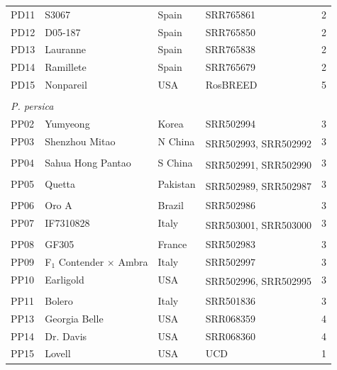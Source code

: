 \documentclass[12pt]{article}
\begin{document}
\begin{center}
\begin{longtable}{llllc}
	PD11 &S3067 &Spain &SRR765861 &2\\
	PD12 &D05-187 &Spain &SRR765850 &2\\
	PD13 &Lauranne &Spain &SRR765838 &2\\
	PD14 &Ramillete &Spain &SRR765679 &2\\
	PD15 &Nonpareil & USA&RosBREED &5\\
	\\
	\multicolumn{5}{l}{\emph{P. persica}}  \\ %
	PP02 &Yumyeong &Korea &SRR502994 &3\\
	PP03 &Shenzhou Mitao &N China &
	\multirow{2}{1cm}{SRR502993, SRR502992} &3\\
	\\
	PP04 &Sahua Hong Pantao &S China &
	\multirow{2}{1cm}{SRR502991, SRR502990} &3\\
	\\
	PP05 &Quetta &Pakistan &
	\multirow{2}{1cm}{SRR502989, SRR502987} &3\\
	\\
	PP06 &Oro A &Brazil &SRR502986 &3\\
	PP07 &IF7310828 &Italy &
	\multirow{2}{2cm}{SRR503001, SRR503000} &3\\
	\\
	PP08 &GF305 &France &SRR502983 &3\\
	PP09 &F$_{1}$ Contender $\times$ Ambra &Italy &SRR502997 &3\\
	PP10 &Earligold &USA &
	\multirow{2}{1cm}{SRR502996, SRR502995} &3\\
	\\
	PP11 &Bolero &Italy &SRR501836 &3\\
	PP13 &Georgia Belle &USA &SRR068359 &4\\
	PP14 &Dr. Davis &USA &SRR068360 &4\\
	PP15 &Lovell &USA &UCD &1\\

\end{longtable}
\end{center}
\end{document}
